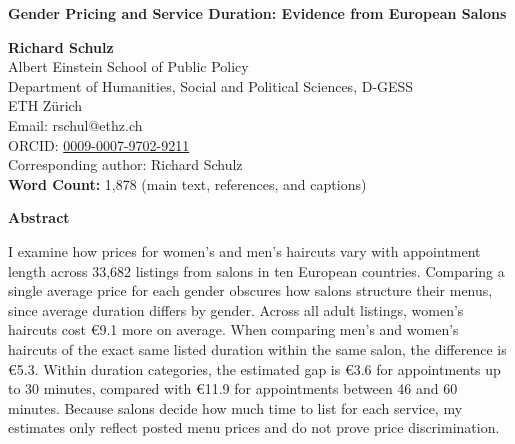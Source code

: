 \documentclass[12pt,a4paper]{article}
\begin{document}

\begin{titlepage}
    \centering
    \vspace*{2cm}
    {\Large\bfseries Gender Pricing and Service Duration: Evidence from European Salons\par}
    \vspace{1.5cm}
    \begin{flushleft}
    \textbf{Richard Schulz}\\
    Albert Einstein School of Public Policy\\
    Department of Humanities, Social and Political Sciences, D-GESS\\
    ETH Zürich\\
    Email: rschul@ethz.ch\\
    ORCID: \href{https://orcid.org/0009-0007-9702-9211}{0009-0007-9702-9211}\\
    Corresponding author: Richard Schulz\\
    \vfill
\textbf{Word Count:} 1,878 (main text, references, and captions)
    \end{flushleft}
    \vfill
\end{titlepage}

\newpage


\begin{center}
    \textbf{Abstract}
\end{center}

\noindent
I examine how prices for women's and men's haircuts vary with appointment length across 33,682 listings from salons in ten European countries. Comparing a single average price for each gender obscures how salons structure their menus, since average duration differs by gender. Across all adult listings, women's haircuts cost €9.1 more on average. When comparing men's and women's haircuts of the exact same listed duration within the same salon, the difference is €5.3. Within duration categories, the estimated gap is €3.6 for appointments up to 30 minutes, compared with €11.9 for appointments between 46 and 60 minutes. Because salons decide how much time to list for each service, my estimates only reflect posted menu prices and do not prove price discrimination.

\vspace{0.5cm}
\end{document}
